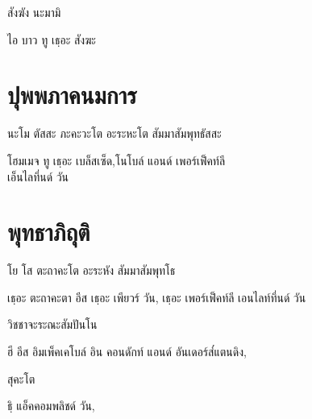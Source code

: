{สังฆัง นะมามิ

\begin{english}
	ไอ บาว ทู เธฺอะ สังฆะ 
\end{english}

\chapter{ปุพพภาคนมการ}

\begin{leader}
\end{leader}

\begin{leader}
\end{leader}

นะโม ตัสสะ ภะคะวะโต อะระหะโต สัมมาสัมพุทธัสสะ

\begin{english}
โฮมเมจ ทู เธฺอะ เบล็สเซ็ด,โนโบล์ แอนด์ เพอร์เฟ็คท์ลี\\
\vin เอ็นไลทึ่นด์ วัน
\end{english}

\chapter{พุทธาภิถุติ}

\begin{leader}
\end{leader}

\begin{leader}
\end{leader}

โย โส ตะถาคะโต อะระหัง สัมมาสัมพุทโธ

\begin{english}
เธฺอะ ตะถาคะตา อีส เธฺอะ เพียวร์ วัน, เธฺอะ เพอร์เฟ็คท์ลี เอนไลท์ทึ่นด์ วัน
\end{english}

วิชชาจะระณะสัมปันโน

\begin{english}
ฮี อีส อิมเพ็คเคโบล์ อิน คอนดักท์ แอนด์ อันเดอร์ส๎แตนดิง,
\end{english}

สุคะโต

\begin{english}
ธิฺ แอ็คคอมพลิชด์ วัน,
\end{english}

}

